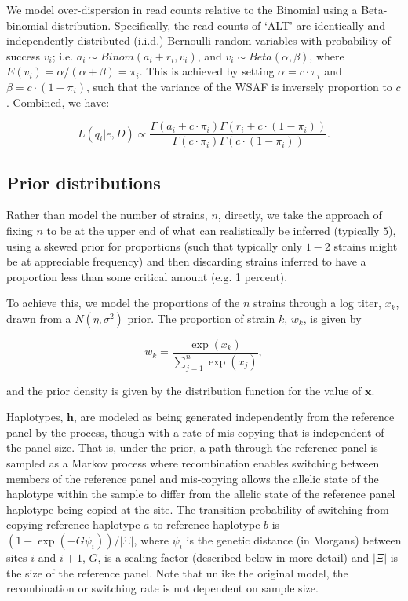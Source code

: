 \documentclass{nature}
\begin{document}
\noindent We model over-dispersion in read counts relative to the Binomial using a Beta-binomial distribution. Specifically, the read counts of `ALT' are identically and independently distributed (i.i.d.) Bernoulli random variables with probability of success $v_i$; i.e. $a_i \sim Binom(a_i + r_i, v_i)$, and $v_i \sim Beta(\alpha, \beta)$, where $E(v_i) = \alpha/(\alpha+\beta) = \pi_{i}$. This is achieved by setting $\alpha = c\cdot \pi_{i} $ and $\beta = c\cdot (1-\pi_{i})$, such that the variance of the WSAF is inversely proportion to $c$.  Combined, we have:

\begin{equation}
L(q_{i}| e, D) \propto \frac{\Gamma(a_i + c\cdot \pi_{i}) \Gamma(r_i + c\cdot (1-\pi_{i}))}{\Gamma(c\cdot \pi_{i})\Gamma(c\cdot (1-\pi_{i}))}. \label{eqn:llk}
\end{equation}


\subsection*{Prior distributions}\label{sec:prior}

Rather than model the number of strains, $n$, directly, we take the approach of fixing $n$ to be at the upper end of what can realistically be inferred (typically $5$), using a skewed prior for proportions (such that typically only $1-2$ strains might be at appreciable frequency) and then discarding strains inferred to have a proportion less than some critical amount (e.g. 1 percent).

To achieve this, we model the proportions of the $n$ strains through a log titer, $x_k$, drawn from a $N(\eta, \sigma^2)$ prior.  The proportion of strain $k$, $w_k$, is given by

\begin{equation}
w_k = \frac{\exp(x_k)}{\sum_{j=1}^n \exp(x_j)},
\end{equation}

\noindent and the prior density is given by the distribution function for the value of $\mathbf{x}$.

Haplotypes, $\mathbf{h}$, are modeled as being generated independently from the reference panel by the \cite{Li2003} process, though with a rate of mis-copying that is independent of the panel size. That is, under the prior, a path through the reference panel is sampled as a Markov process where recombination enables switching between members of the reference panel and mis-copying allows the allelic state of the haplotype within the sample to differ from the allelic state of the reference panel haplotype being copied at the site.  The transition probability of switching from copying reference haplotype $a$ to reference haplotype $b$ is $(1-\exp(-G \psi_i))/|\Xi|$, where $\psi_i$ is the genetic distance (in Morgans) between sites $i$ and $i+1$, $G$, is a scaling factor (described below in more detail) and $|\Xi|$ is the size of the reference panel.  Note that unlike the original model, the recombination or switching rate is not dependent on sample size.
\end{document}
